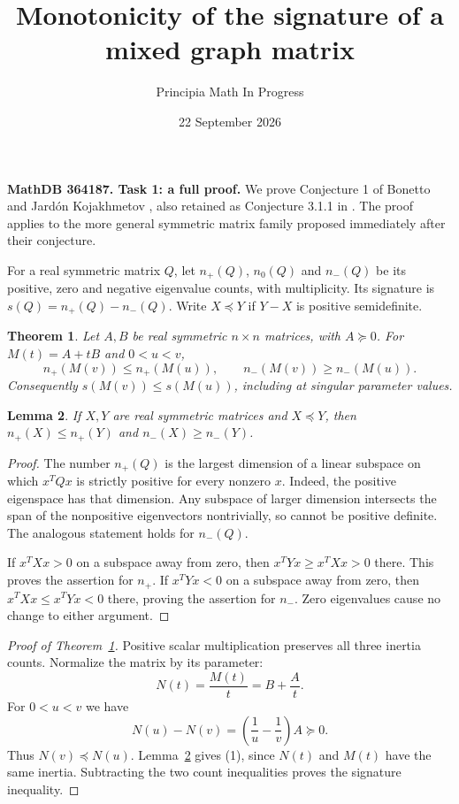 \documentclass[11pt]{article}
\title{Monotonicity of the signature of a mixed graph matrix}
\author{Principia Math In Progress}
\date{22 September 2026}
\newtheorem{theorem}{Theorem}
\newtheorem{lemma}[theorem]{Lemma}
\begin{document}
\maketitle
\noindent\textbf{MathDB 364187. Task 1: a full proof.}
We prove Conjecture 1 of Bonetto and Jard\'on Kojakhmetov
\cite[p.~7]{source}, also retained as Conjecture 3.1.1 in
\cite[p.~55]{thesis}. The proof applies to the more general symmetric
matrix family proposed immediately after their conjecture.

For a real symmetric matrix $Q$, let $n_+(Q)$, $n_0(Q)$ and $n_-(Q)$
be its positive, zero and negative eigenvalue counts, with multiplicity.
Its signature is $s(Q)=n_+(Q)-n_-(Q)$. Write $X\preceq Y$ if
$Y-X$ is positive semidefinite.

\begin{theorem}\label{main}
Let $A,B$ be real symmetric $n\times n$ matrices, with $A\succeq0$.
For $M(t)=A+tB$ and $0<u<v$,
\[
 n_+(M(v))\le n_+(M(u)),\qquad
 n_-(M(v))\ge n_-(M(u)).                              \tag{1}
\]
Consequently $s(M(v))\le s(M(u))$, including at singular parameter values.
\end{theorem}

\begin{lemma}\label{order}
If $X,Y$ are real symmetric matrices and $X\preceq Y$, then
$n_+(X)\le n_+(Y)$ and $n_-(X)\ge n_-(Y)$.
\end{lemma}
\begin{proof}
The number $n_+(Q)$ is the largest dimension of a linear subspace on
which $x^TQx$ is strictly positive for every nonzero $x$. Indeed, the
positive eigenspace has that dimension. Any subspace of larger dimension
intersects the span of the nonpositive eigenvectors nontrivially, so
cannot be positive definite. The analogous statement holds for $n_-(Q)$.

If $x^TXx>0$ on a subspace away from zero, then
$x^TYx\ge x^TXx>0$ there. This proves the assertion for $n_+$.
If $x^TYx<0$ on a subspace away from zero, then
$x^TXx\le x^TYx<0$ there, proving the assertion for $n_-$.
Zero eigenvalues cause no change to either argument.
\end{proof}

\begin{proof}[Proof of Theorem~\ref{main}]
Positive scalar multiplication preserves all three inertia counts.
Normalize the matrix by its parameter:
\[
 N(t)=\frac{M(t)}t=B+\frac At.
\]
For $0<u<v$ we have
\[
 N(u)-N(v)=\left(\frac1u-\frac1v\right)A\succeq0.     \tag{2}
\]
Thus $N(v)\preceq N(u)$. Lemma~\ref{order} gives (1), since
$N(t)$ and $M(t)$ have the same inertia. Subtracting the two count
inequalities proves the signature inequality.
\end{proof}
\end{document}

